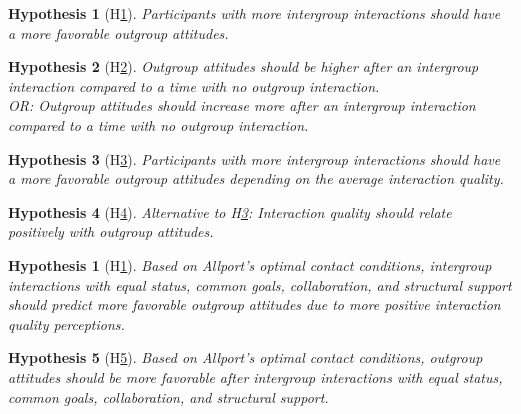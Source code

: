 \documentclass[nobib]{tufte-handout}
\theoremstyle{break}
\theoremstyle{plain}
\newtheorem{hyp}{Hypothesis}
\newtheorem{subhyp}{Hypothesis}
\begin{document}
\begin{subhyp}[H\ref{hyp:contactFreq}] \label{hyp:contactFreq}
\addtolength{\leftskip}{2.5em}
Participants  with more intergroup interactions should have a more favorable outgroup attitudes.
\end{subhyp}

\begin{subhyp}[H\ref{hyp:contactDummy}] \label{hyp:contactDummy}
\addtolength{\leftskip}{2.5em}
Outgroup attitudes should be higher after an intergroup interaction compared to a time with no outgroup interaction.\\
OR: Outgroup attitudes should increase more after an intergroup interaction compared to a time with no outgroup interaction.
\end{subhyp}

\begin{subhyp}[H\ref{hyp:contactFreqQual}] \label{hyp:contactFreqQual}
\addtolength{\leftskip}{2.5em}
Participants  with more intergroup interactions should have a more favorable outgroup attitudes depending on the average interaction quality.
\end{subhyp}

\begin{subhyp}[H\ref{hyp:contactQualCor}] \label{hyp:contactQualCor}
\addtolength{\leftskip}{2.5em}
Alternative to H\ref{hyp:contactFreqQual}:  Interaction quality should relate positively with outgroup attitudes.
\end{subhyp}

\begin{hyp}[H\ref{hyp:AllportsConditions}] \label{hyp:AllportsConditions}
Based on Allport's optimal contact conditions, intergroup interactions with equal status, common goals, collaboration, and structural support should predict more favorable outgroup attitudes due to more positive interaction quality perceptions.
\end{hyp}

\setcounter{subhyp}{0}
\begin{subhyp}[H\ref{hyp:AllportsPred}] \label{hyp:AllportsPred}
\addtolength{\leftskip}{2.5em}
Based on Allport's optimal contact conditions, outgroup attitudes should be more favorable after intergroup interactions with equal status, common goals, collaboration, and structural support.
\end{subhyp}
\end{document}

